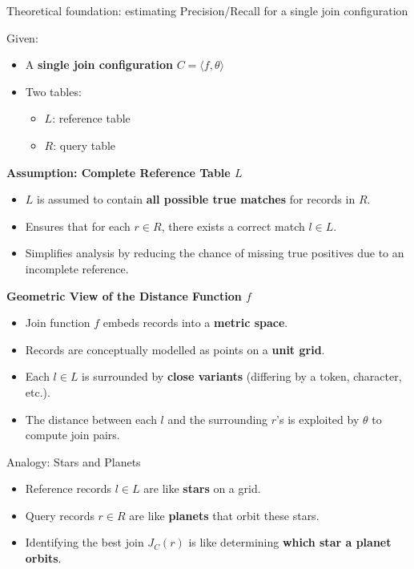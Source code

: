 \documentclass[8pt]{beamer} %
\begin{document}
\begin{frame}{Theoretical foundation: estimating Precision/Recall for a single join configuration}
	
	Given:
	\begin{itemize}
		\item A \textbf{single join configuration} $C = \langle f, \theta \rangle$
		\item Two tables:
		\begin{itemize}
			\item $L$: reference table
			\item $R$: query table
		\end{itemize}
	\end{itemize}
	
	\vspace{0.5em}
	\textbf{Assumption: Complete Reference Table $L$}
	\begin{itemize}
		\item $L$ is assumed to contain \textbf{all possible true matches} for records in $R$.
		\item Ensures that for each $r \in R$, there exists a correct match $l \in L$.
		\item Simplifies analysis by reducing the chance of missing true positives due to an incomplete reference.
	\end{itemize}
	
	\vspace{0.5em}
	\textbf{Geometric View of the Distance Function $f$}
	\begin{itemize}
		\item Join function $f$ embeds records into a \textbf{metric space}.
		\item Records are conceptually modelled as points on a \textbf{unit grid}.
		\item Each $l \in L$ is surrounded by \textbf{close variants} (differing by a token, character, etc.).
		\item The distance between each $l$ and the surrounding $r$'s is exploited by $\theta$ to compute join pairs.
	\end{itemize}
	
	\vspace{0.5em}
	\begin{block}{Analogy: Stars and Planets}
		\begin{itemize}
			\item Reference records $l \in L$ are like \textbf{stars} on a grid.
			\item Query records $r \in R$ are like \textbf{planets} that orbit these stars.
			\item Identifying the best join $J_C(r)$ is like determining \textbf{which star a planet orbits}.
		\end{itemize}
	\end{block}
	
\end{frame}
\end{document}
